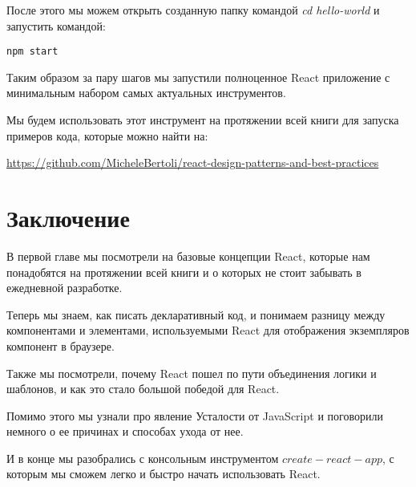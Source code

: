 После этого мы можем открыть созданную папку командой \textit{cd hello-world} и запустить командой:

\begin{lstlisting}
npm start
\end{lstlisting}

Таким образом за пару шагов мы запустили полноценное React приложение с минимальным набором самых актуальных инструментов.

Мы будем использовать этот инструмент на протяжении всей книги для запуска примеров кода, которые можно найти на:

\href{https://github.com/MicheleBertoli/react-design-patterns-and-best-practices}{https://github.com/MicheleBertoli/react-design-patterns-and-best-practices}

\section{Заключение}

В первой главе мы посмотрели на базовые концепции React, которые нам понадобятся на протяжении всей книги и о которых не стоит забывать в ежедневной разработке.

Теперь мы знаем, как писать декларативный код, и понимаем разницу между компонентами и элементами, используемыми React для отображения экземпляров компонент в браузере.

Также мы посмотрели, почему React пошел по пути объединения логики и шаблонов, и как это стало большой победой для React.

Помимо этого мы узнали про явление Усталости от JavaScript и поговорили немного о ее причинах и способах ухода от нее.

И в конце мы разобрались с консольным инструментом $create-react-app$, с которым мы сможем легко и быстро начать использовать React.




